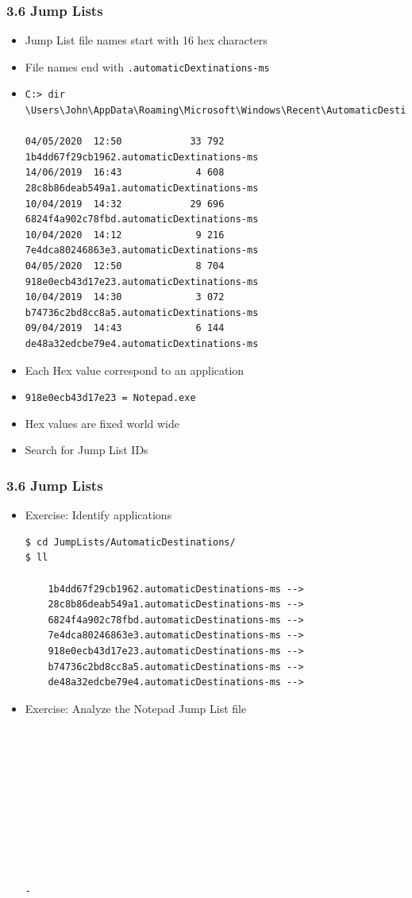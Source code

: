 \begin{frame}[fragile]
  \frametitle{3.6 Jump Lists}
    \begin{itemize}
        \item Jump List file names start with 16 hex characters
	\item File names end with \texttt{.automaticDextinations-ms}
	\item[]
  \begin{lstlisting}[basicstyle=\tiny]
C:> dir \Users\John\AppData\Roaming\Microsoft\Windows\Recent\AutomaticDestinations

04/05/2020  12:50            33 792 1b4dd67f29cb1962.automaticDextinations-ms
14/06/2019  16:43             4 608 28c8b86deab549a1.automaticDextinations-ms
10/04/2019  14:32            29 696 6824f4a902c78fbd.automaticDextinations-ms
10/04/2020  14:12             9 216 7e4dca80246863e3.automaticDextinations-ms
04/05/2020  12:50             8 704 918e0ecb43d17e23.automaticDextinations-ms
10/04/2019  14:30             3 072 b74736c2bd8cc8a5.automaticDextinations-ms
09/04/2019  14:43             6 144 de48a32edcbe79e4.automaticDextinations-ms
  \end{lstlisting}
	\item Each Hex value correspond to an application
	\item \texttt{918e0ecb43d17e23 = Notepad.exe}
	\item Hex values are fixed world wide
        \item Search for Jump List IDs
    \end{itemize}
\end{frame}


\begin{frame}[fragile]
  \frametitle{3.6 Jump Lists}
    \begin{itemize}
        \item Exercise: Identify applications
  \begin{lstlisting}[basicstyle=\tiny]
$ cd JumpLists/AutomaticDestinations/
$ ll

    1b4dd67f29cb1962.automaticDestinations-ms --> 
    28c8b86deab549a1.automaticDestinations-ms --> 
    6824f4a902c78fbd.automaticDestinations-ms --> 
    7e4dca80246863e3.automaticDestinations-ms --> 
    918e0ecb43d17e23.automaticDestinations-ms --> 
    b74736c2bd8cc8a5.automaticDestinations-ms --> 
    de48a32edcbe79e4.automaticDestinations-ms --> 
  \end{lstlisting}
	\item Exercise: Analyze the Notepad Jump List file
  \begin{lstlisting}[basicstyle=\tiny]










-
  \end{lstlisting}
    \end{itemize}
\end{frame}


